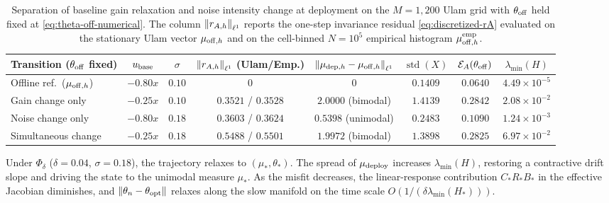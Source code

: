 \begin{table}[htpb]
\centering
\footnotesize
\setlength{\tabcolsep}{2.5pt}
\begin{tabular}{lccccccc}
\toprule
\textbf{Transition ($\theta_{\rm off}$ fixed)} & $u_{\rm base}$ & $\sigma$ & $\left\lVert r_{A,h}\right\rVert_{\ell^1}$ \textbf{(Ulam/Emp.)} & $\left\lVert \mu_{{\rm dep},h}-\mu_{{\rm off},h}\right\rVert_{\ell^1}$ & $\operatorname{std}(X)$ & $\mathcal{E}_A(\theta_{\rm off})$ & $\lambda_{\min}(H)$ \\
\midrule
Offline ref.\ ($\mu_{{\rm off},h}$) & $-0.80x$ & $0.10$ & $0$ & $0$ & $0.1409$ & $0.0640$ & $4.49\times 10^{-5}$ \\
Gain change only & $-0.25x$ & $0.10$ & $0.3521$ / $0.3528$ & $2.0000$ (bimodal) & $1.4139$ & $0.2842$ & $2.08\times 10^{-2}$ \\
Noise change only & $-0.80x$ & $0.18$ & $0.3603$ / $0.3624$ & $0.5398$ (unimodal) & $0.2483$ & $0.1090$ & $1.24\times 10^{-3}$ \\
Simultaneous change & $-0.25x$ & $0.18$ & $0.5488$ / $0.5501$ & $1.9972$ (bimodal) & $1.3898$ & $0.2825$ & $6.97\times 10^{-2}$ \\
\bottomrule
\end{tabular}
\caption{Separation of baseline gain relaxation and noise intensity change at deployment on the $M=1{,}200$ Ulam grid with $\theta_{\rm off}$ held fixed at \eqref{eq:theta-off-numerical}. The column $\left\lVert r_{A,h}\right\rVert_{\ell^1}$ reports the one-step invariance residual \eqref{eq:discretized-rA} evaluated on the stationary Ulam vector $\mu_{{\rm off},h}$ and on the cell-binned $N=10^5$ empirical histogram $\mu_{{\rm off},h}^{\rm emp}$.}
\label{tab:deployment_ablation}
\end{table}

Under $\Phi_\delta$ ($\delta=0.04$, $\sigma=0.18$), the trajectory relaxes to $(\mu_*, \theta_*)$. The spread of $\mu_{\rm deploy}$ increases $\lambda_{\min}(H)$, restoring a contractive drift slope and driving the state to the unimodal measure $\mu_*$. As the misfit decreases, the linear-response contribution $C_*R_*B_*$ in the effective Jacobian diminishes, and $\left\lVert \theta_n - \theta_{\rm opt}\right\rVert$ relaxes along the slow manifold on the time scale $O(1/(\delta\lambda_{\min}(H_*)))$.

